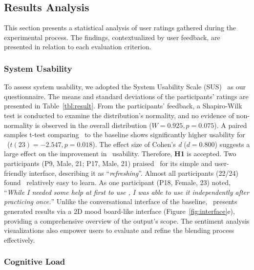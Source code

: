 \subsection{Results Analysis}

This section presents a statistical analysis of user ratings gathered during the experimental process.
The findings, contextualized by user feedback, are presented in relation to each evaluation criterion. 


\subsubsection{System Usability}

To assess system usability, we adopted the System Usability Scale (SUS)~\cite{brooke1996sus} as our questionnaire.
The means and standard deviations of the participants' ratings are presented in Table~\ref{tbl:result}.
From the participants' feedback, a Shapiro-Wilk test is conducted to examine the distribution's normality, and no evidence of non-normality is observed in the overall distribution ($W = 0.925, p = 0.075$).
A paired samples t-test comparing \sysname\ to the baseline shows significantly higher usability for \sysname\ ($t(23) = -2.547, p = 0.018$).
The effect size of Cohen's \textit{d} ($d = 0.800$) suggests a large effect on the improvement in \sysname\ usability.
Therefore, \textbf{H1} is accepted.
Two participants (P9, Male, 21; P17, Male, 21) praised \sysname\ for its simple and user-friendly interface, describing it as ``\textit{refreshing}''.
Almost all participants (22/24) found \sysname\ relatively easy to learn.
As one participant (P18, Female, 23) noted, ``\textit{While I needed some help at first to use \sysname, I was able to use it independently after practicing once.}''
Unlike the conversational interface of the baseline, \sysname\ presents generated results via a 2D mood board-like interface (Figure~\ref{fig:interface}e), providing a comprehensive overview of the output's scope.
The sentiment analysis visualizations also empower users to evaluate and refine the blending process effectively.





\subsubsection{Cognitive Load}



